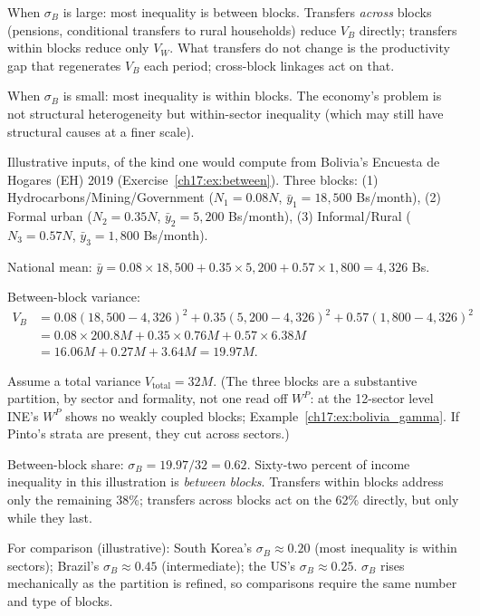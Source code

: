 \documentclass[../structural_economics_book.tex]{subfiles}
\begin{document}
When $\sigma_B$ is large: most inequality is between blocks. Transfers \emph{across} blocks (pensions, conditional transfers to rural households) reduce $V_B$ directly; transfers within blocks reduce only $V_W$. What transfers do not change is the productivity gap that regenerates $V_B$ each period; cross-block linkages act on that.

When $\sigma_B$ is small: most inequality is within blocks. The economy's problem is not structural heterogeneity but within-sector inequality (which may still have structural causes at a finer scale).

\begin{example}\label{ch17:ex:bolivia_between}
Illustrative inputs, of the kind one would compute from Bolivia's Encuesta de Hogares (EH) 2019 (Exercise~\ref{ch17:ex:between}). Three blocks: (1) Hydrocarbons/Mining/Government ($N_1 = 0.08N$, $\bar{y}_1 = 18{,}500$ Bs/month), (2) Formal urban ($N_2 = 0.35N$, $\bar{y}_2 = 5{,}200$ Bs/month), (3) Informal/Rural ($N_3 = 0.57N$, $\bar{y}_3 = 1{,}800$ Bs/month).

National mean: $\bar{y} = 0.08 \times 18{,}500 + 0.35 \times 5{,}200 + 0.57 \times 1{,}800 = 4{,}326$ Bs.

Between-block variance:
\begin{align}
V_B &= 0.08(18{,}500 - 4{,}326)^2 + 0.35(5{,}200 - 4{,}326)^2 + 0.57(1{,}800 - 4{,}326)^2 \\
&= 0.08 \times 200.8M + 0.35 \times 0.76M + 0.57 \times 6.38M \\
&= 16.06M + 0.27M + 3.64M = 19.97M.
\end{align}

Assume a total variance $V_{\text{total}} = 32M$. (The three blocks are a substantive partition, by sector and formality, not one read off $W^P$: at the 12-sector level INE's $W^P$ shows no weakly coupled blocks; Example~\ref{ch17:ex:bolivia_gamma}. If Pinto's strata are present, they cut across sectors.)

Between-block share: $\sigma_B = 19.97/32 = 0.62$. Sixty-two percent of income inequality in this illustration is \textit{between blocks}. Transfers within blocks address only the remaining 38\%; transfers across blocks act on the 62\% directly, but only while they last.

For comparison (illustrative): South Korea's $\sigma_B \approx 0.20$ (most inequality is within sectors); Brazil's $\sigma_B \approx 0.45$ (intermediate); the US's $\sigma_B \approx 0.25$. $\sigma_B$ rises mechanically as the partition is refined, so comparisons require the same number and type of blocks.
\end{example}
\end{document}
